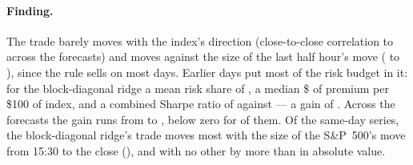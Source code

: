 %
\paragraph{Finding.} The trade barely moves with the index's direction
(close-to-close correlation \runappPwCorrLo{} to \runappPwCorrHi{} across the
\runappPwForecasts{} forecasts) and moves against the size of the last half
hour's move (\runappPwAbsLo{} to \runappPwAbsHi{}), since the rule sells on
most days. Earlier days put most of the risk budget in it: for the
block-diagonal ridge a mean risk share of \runappPwShare{}, a median
\$\runappPwDollar{} of premium per \$100 of index, and a combined Sharpe ratio
of \runappPwComb{} against \runappPwSpx{} --- a gain of \runappPwGain{}. Across
the forecasts the gain runs from \runappPwGainLo{} to \runappPwGainHi{}, below
zero for \runappPwGainBelow{} of them. Of the \runappCoSeries{} same-day series, the
block-diagonal ridge's trade moves most with the size of the S\&P~500's move
from 15:30 to the close (\runappCoMax{}), and with no other by more than
\runappCoRestMax{} in absolute value.

